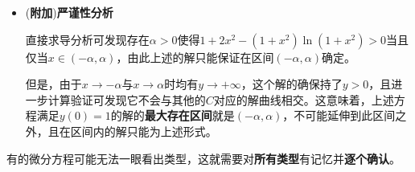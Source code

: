 \documentclass[a4paper,UTF8,fontset=windows,AutoFakeBold]{ctexart}
\newcommand*{\extra}{\textbf{附加}}
\newcommand*{\note}{\noindent *}
\theoremstyle{ex}
\begin{document}
\begin{framed}
{\begin{itemize}
        \item (\extra)\textbf{严谨性分析}
        
        直接求导分析可发现存在$\alpha>0$使得$1+2x^2-(1+x^2)\ln(1+x^2)>0$当且仅当$x\in(-\alpha,\alpha)$，由此上述的解只能保证在区间$(-\alpha,\alpha)$确定。

        但是，由于$x\to-\alpha$与$x\to\alpha$时均有$y\to+\infty$，这个解的确保持了$y>0$，且进一步计算验证可发现它不会与其他的$C$对应的解曲线相交。这意味着，上述方程满足$y(0)=1$的解的\textbf{最大存在区间}就是$(-\alpha,\alpha)$，不可能延伸到此区间之外，且在区间内的解只能为上述形式。
    \end{itemize}
}
\end{framed}

\note 有的微分方程可能无法一眼看出类型，这就需要对\textbf{所有类型}有记忆并\textbf{逐个确认}。
\end{document}
